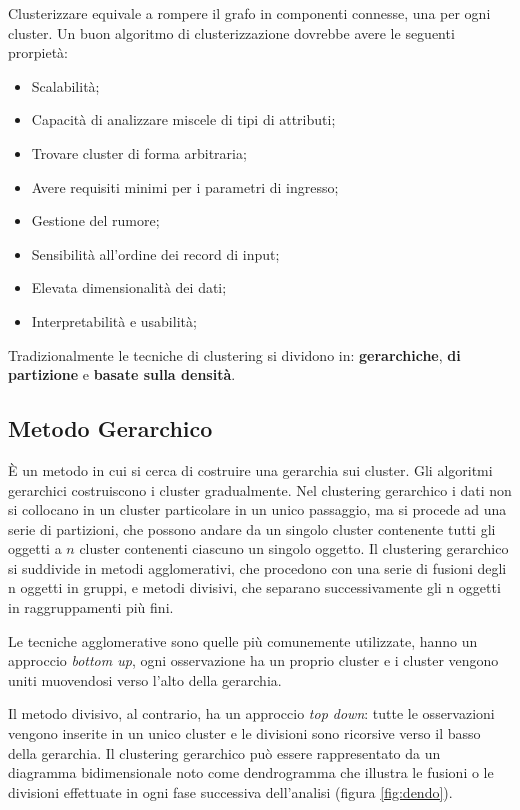 Clusterizzare equivale a rompere il grafo in componenti connesse, una per ogni cluster. Un buon algoritmo di clusterizzazione  dovrebbe avere le seguenti prorpietà:
\begin{itemize}
	\item Scalabilità;
	\item Capacità di analizzare miscele di tipi di attributi;
	\item Trovare cluster di forma arbitraria;
	\item Avere requisiti minimi per i parametri di ingresso;
	\item Gestione del rumore;
	\item Sensibilità all'ordine dei record di input;
	\item Elevata dimensionalità dei dati;
	\item Interpretabilità e usabilità;
\end{itemize}



Tradizionalmente le tecniche di clustering si dividono in: \textbf{gerarchiche}, \textbf{di partizione} e \textbf{basate sulla densità}. 

\subsection{Metodo Gerarchico}

È un metodo in cui si cerca di costruire una gerarchia sui cluster. Gli algoritmi gerarchici costruiscono i cluster gradualmente.
Nel clustering gerarchico i dati non si collocano in un cluster particolare in un unico passaggio, ma si procede ad una serie di partizioni, che possono andare da un singolo cluster contenente tutti gli oggetti a $n$ cluster contenenti ciascuno un singolo oggetto. 
Il clustering gerarchico si suddivide in metodi agglomerativi, che procedono con una serie di fusioni degli n oggetti in gruppi, e metodi divisivi, che separano successivamente gli n oggetti in raggruppamenti più fini. 

Le tecniche agglomerative sono quelle più comunemente utilizzate, hanno un approccio \textit{bottom up}, ogni osservazione ha un proprio cluster e i cluster vengono uniti muovendosi verso l'alto della gerarchia.

Il metodo divisivo, al contrario, ha un approccio \textit{top down}: tutte le osservazioni vengono inserite in un unico cluster e le divisioni sono ricorsive verso il basso della gerarchia.
 Il clustering gerarchico può essere rappresentato da un diagramma bidimensionale noto come dendrogramma che illustra le fusioni o le divisioni effettuate in ogni fase successiva dell'analisi (figura \ref{fig:dendo}).

